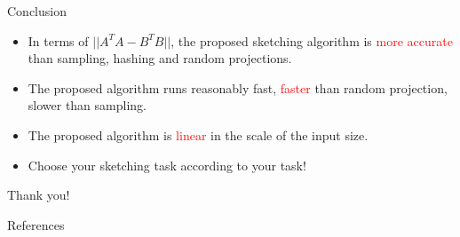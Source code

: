 \documentclass[first=dgreen,second=purple,logo=redque]{aaltoslides}
\begin{document}
%
%

\begin{frame}{Conclusion}
\begin{itemize}
  \item In terms of $|| A^TA - B^TB||$, the proposed sketching algorithm is \textcolor{red}{more accurate} than sampling, hashing and random projections.
  \item The proposed algorithm runs reasonably fast, \textcolor{red}{faster} than random projection, slower than sampling.
  \item The proposed algorithm is \textcolor{red}{linear} in the scale of the input size.
  \item Choose your sketching task according to your task!
\end{itemize}
\end{frame}

\begin{frame}{}
Thank you!
\end{frame}



\begin{frame}{References}
\small

\end{frame}
\end{document}
